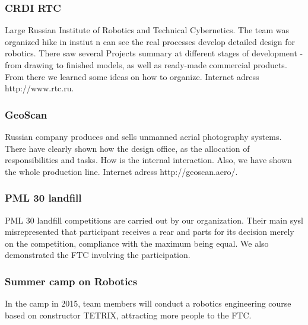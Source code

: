 	\subsubsection{CRDI RTC}
		Large Russian Institute of Robotics and Technical Cybernetics. The team was organized hike in instiut n can see the real processes develop detailed design for robotics. There saw several Projects summary at different stages of development - from drawing to finished models, as well as ready-made commercial products. From there we learned some ideas on how to organize. Internet adress http://www.rtc.ru.	
	\subsubsection{GeoScan}
		Russian company produces and sells unmanned aerial photography systems. There have clearly shown how the design office, as the allocation of responsibilities and tasks. How is the internal interaction. Also, we have shown the whole production line. Internet adress http://geoscan.aero/.	
	\subsubsection{PML 30 landfill}	
		PML 30 landfill competitions are carried out by our organization. Their main sysl misrepresented that participant receives a rear and parts for its decision merely on the competition, compliance with the maximum being equal. We also demonstrated the FTC involving the participation.
	\subsubsection{Summer camp on Robotics}
	In the camp in 2015, team members will conduct a robotics engineering course based on constructor TETRIX, attracting more people to the FTC.
		
		
		
		
		
		
		
		
		